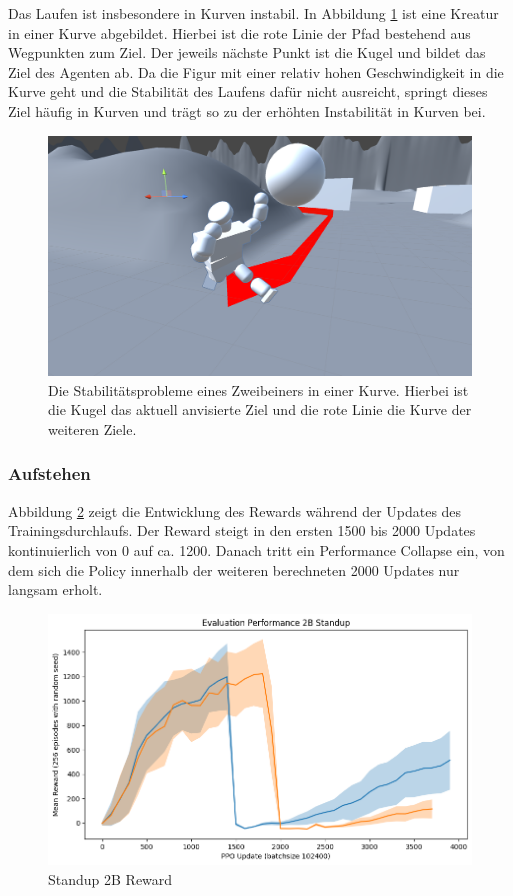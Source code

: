 Das Laufen ist insbesondere in Kurven instabil. In Abbildung \ref{fig:2bKurve} ist eine Kreatur in einer Kurve abgebildet. Hierbei ist die rote Linie der Pfad bestehend aus Wegpunkten zum Ziel. Der jeweils nächste Punkt ist die Kugel und bildet das Ziel des Agenten ab. Da die Figur mit einer relativ hohen Geschwindigkeit in die Kurve geht und die Stabilität des Laufens dafür nicht ausreicht, springt dieses Ziel häufig in Kurven und trägt so zu der erhöhten Instabilität in Kurven bei.

\begin{figure}
	\centering
	\includegraphics[width=0.7\linewidth]{resources/img/Unity_id9Hnh5u8N}
	\caption[Zweibeiner in einer Kurve]{Die Stabilitätsprobleme eines Zweibeiners in einer Kurve. Hierbei ist die Kugel das aktuell anvisierte Ziel und die rote Linie die Kurve der weiteren Ziele.}
	\label{fig:2bKurve}
\end{figure}

\subsubsection{Aufstehen}

Abbildung \ref{fig:Standup2B_Reward} zeigt die Entwicklung des Rewards während der Updates des Trainingsdurchlaufs. Der Reward steigt in den ersten 1500 bis 2000 Updates kontinuierlich von 0 auf ca. 1200. Danach tritt ein Performance Collapse ein, von dem sich die Policy innerhalb der weiteren berechneten 2000 Updates nur langsam erholt.


\begin{figure}[ht]
    \centering
    \includegraphics[width=0.5\linewidth]{resources/img/results/Standup2B_Reward.png}
    \caption{Standup 2B Reward}\label{fig:Standup2B_Reward}
\end{figure}

